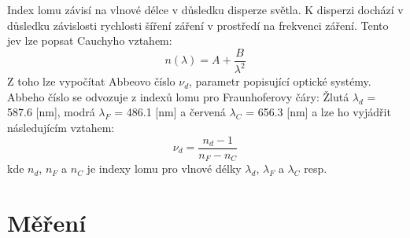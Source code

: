\documentclass[a4paper,11pt]{article}
\begin{document}
\newpage
    \begin{minipage}[t]{0.5\textwidth}
            Index lomu závisí na vlnové délce v důsledku disperze světla. K disperzi dochází v důsledku závislosti rychlosti šíření záření v prostředí na frekvenci záření. Tento jev lze popsat Cauchyho vztahem:
            \begin{equation}
                n(\lambda) = A + \frac{B}{\lambda^2}
            \end{equation}
            Z toho lze vypočítat Abbeovo číslo $\nu_d$, parametr popisující optické systémy. Abbeho číslo se odvozuje z indexů lomu pro Fraunhoferovy čáry: Žlutá $\lambda_d$ = 587.6 [nm], modrá $\lambda_F$ = 486.1 [nm] a červená $\lambda_C$ = 656.3 [nm] a lze ho vyjádřit následujícím vztahem:
            \begin{equation}
                \nu_d = \frac{n_d - 1}{n_F - n_C}
            \end{equation}
            kde $n_d$, $n_F$ a $n_C$ je indexy lomu pro vlnové délky $\lambda_d$, $\lambda_F$ a $\lambda_C$ resp. 
    \section{Měření}  

\end{minipage}
\end{document}
